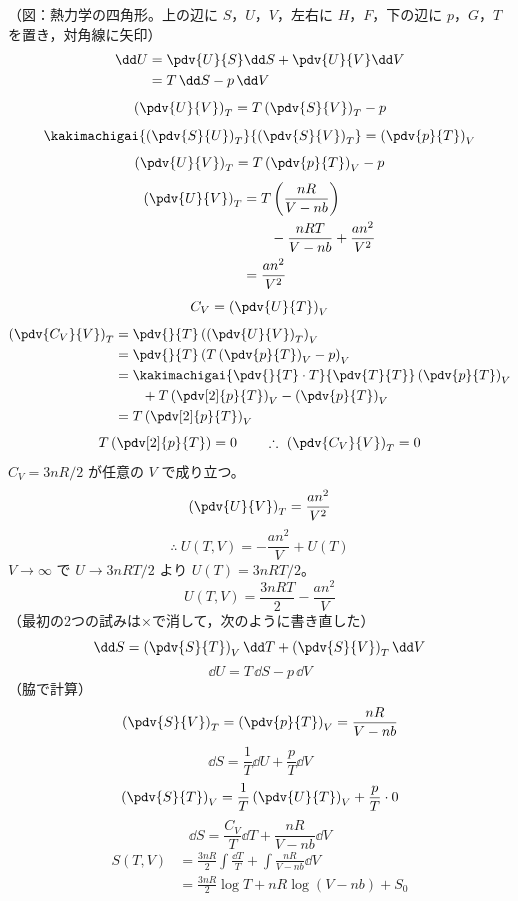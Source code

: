 （図：熱力学の四角形。上の辺に $S$，$U$，$V$，左右に $H$，$F$，下の辺に $p$，$G$，$T$ を置き，対角線に矢印）
\begin{align*}
\dd U&=\pdv{U}{S}\dd S+\pdv{U}{V}\dd V\\
&=T\,\dd S-p\,\dd V
\end{align*}
\[ \left(\pdv{U}{V}\right)_{T}=T\left(\pdv{S}{V}\right)_{T}-p \]
\[ \kakimachigai{\left(\pdv{S}{U}\right)_{T}}{\left(\pdv{S}{V}\right)_{T}}=\left(\pdv{p}{T}\right)_{V} \]
\[ \left(\pdv{U}{V}\right)_{T}=T\left(\pdv{p}{T}\right)_{V}-p \]
\begin{align*}
\left(\pdv{U}{V}\right)_{T}&=T\left(\frac{nR}{V-nb}\right)\\
&\qquad-\frac{nRT}{V-nb}+\frac{an^{2}}{V^{2}}\\
&=\frac{an^{2}}{V^{2}}
\end{align*}
\[ C_{V}=\left(\pdv{U}{T}\right)_{V} \]
\begin{align*}
\left(\pdv{C_{V}}{V}\right)_{T}&=\pdv{}{T}\left(\left(\pdv{U}{V}\right)_{T}\right)_{V}\\
&=\pdv{}{T}\left(T\left(\pdv{p}{T}\right)_{V}-p\right)_{V}\\
&=\kakimachigai{\pdv{}{T}\cdot T}{\pdv{T}{T}}\left(\pdv{p}{T}\right)_{V}\\
&\qquad+T\left(\pdv[2]{p}{T}\right)_{V}-\left(\pdv{p}{T}\right)_{V}\\
&=T\left(\pdv[2]{p}{T}\right)_{V}
\end{align*}
\[ T\left(\pdv[2]{p}{T}\right)=0\qquad\therefore\ \left(\pdv{C_{V}}{V}\right)_{T}=0 \]
$C_{V}=3nR/2$ が任意の $V$ で成り立つ。
\[ \left(\pdv{U}{V}\right)_{T}=\frac{an^{2}}{V^{2}} \]
\[ \therefore\ U(T,V)=-\frac{an^{2}}{V}+U(T) \]
$V\to\infty$ で $U\to3nRT/2$ より $U(T)=3nRT/2$。
\[ U(T,V)=\frac{3nRT}{2}-\frac{an^{2}}{V} \]
（最初の2つの試みは×で消して，次のように書き直した）
\[ \dd S=\left(\pdv{S}{T}\right)_{V}\dd T+\left(\pdv{S}{V}\right)_{T}\dd V \]
\[ \dd U=T\,\dd S-p\,\dd V \]
（脇で計算）
\[ \left(\pdv{S}{V}\right)_{T}=\left(\pdv{p}{T}\right)_{V}=\frac{nR}{V-nb} \]
\[ \dd S=\frac{1}{T}\dd U+\frac{p}{T}\dd V \]
\[ \left(\pdv{S}{T}\right)_{V}=\frac{1}{T}\left(\pdv{U}{T}\right)_{V}+\frac{p}{T}\cdot0 \]
\[ \dd S=\frac{C_{V}}{T}\dd T+\frac{nR}{V-nb}\dd V \]
\begin{align*}
S(T,V)&=\frac{3nR}{2}\int\frac{\dd T}{T}+\int\frac{nR}{V-nb}\dd V\\
&=\frac{3nR}{2}\log T+nR\log(V-nb)+S_{0}
\end{align*}
